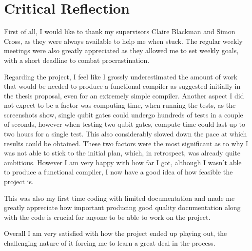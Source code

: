 \section{Critical Reflection}
\label{criticalreflection}

First of all, I would like to thank my supervisors Claire Blackman and Simon Cross, as they were always available to help me when stuck. The regular weekly meetings 
were also greatly appreciated as they allowed me to set weekly goals, with a short deadline to combat procrastination.


Regarding the project, I feel like I grossly underestimated the amount of work that would be needed to produce a functional compiler 
as suggested initially in the thesis proposal, even for an extremely simple compiler. Another aspect I did not expect to be a factor was computing time,
when running the tests, as the screenshots show, single qubit gates could undergo hundreds of tests in a couple of seconds, however 
when testing two-qubit gates, compute time could last up to two hours for a single test.  This also considerably slowed down 
the pace at which results could be obtained. 
These two factors were the most significant as to why I was not able to stick to the initial plan, which, in retrospect, was already quite ambitious. However I am very happy with how far I got,
although I wasn't able to produce a functional compiler, I now have a good idea of how feasible the project is.


This was also my first time coding with limited documentation and made me greatly appreciate how important producing good quality documentation along with the code is crucial for anyone to be able to work on the project.


Overall I am very satisfied with how the project ended up playing out, the challenging nature of it forcing me to learn a great deal in the process.


